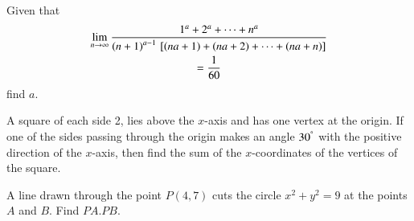 \documentclass[journal,12pt,twocolumn]{IEEEtran}
\begin{document}
\begin{problem}
Given that
\begin{multline}
\lim_{n \rightarrow \infty} \frac{1^a+2^a+\dots + n^a}{\left(n+1\right)^{a-1}{}\left[\left(na+1\right)+\left(na+2\right)+\dots+\left(na+n\right)\right]}
\\
=\frac{1}{60}
\end{multline}
%
find $a$.
\end{problem}
%
%
\begin{problem}
A square of each side 2, lies above the
$x$-axis and has one vertex at the origin. If one of
the sides passing through the origin makes an angle
$30^{\degree}$ with the positive direction of the $x$-axis, then
find the sum of the $x$-coordinates of the vertices of
the square.
\end{problem}
%
%
%
\begin{problem}
A line drawn through the point $P (4, 7)$
cuts the circle $x^2 + y^2 = 9$ at the points $A$ and $B$.
Find $PA.PB$.
\end{problem}
%
%
\end{document}
